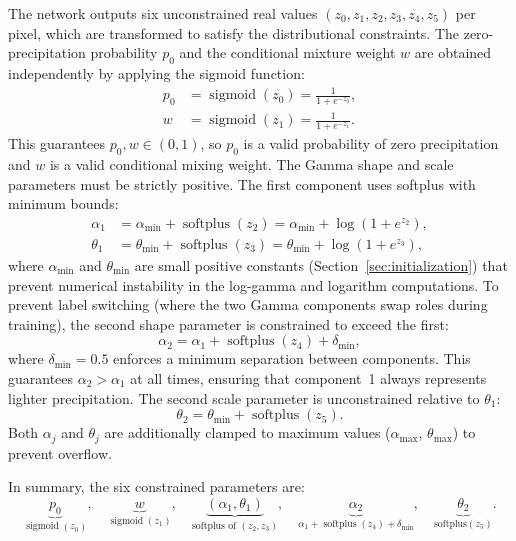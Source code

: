 \documentclass[11pt]{article}
\DeclareMathOperator{\softplus}{softplus}
\DeclareMathOperator{\sigmoid}{sigmoid}
\begin{document}
The network outputs six unconstrained real values
$(z_0, z_1, z_2, z_3, z_4, z_5)$ per pixel, which are
transformed to satisfy the distributional constraints.
The zero-precipitation probability $p_0$ and the conditional
mixture weight $w$ are obtained independently by applying the
sigmoid function:
\begin{align}
  p_0 &= \sigmoid(z_0) = \frac{1}{1 + e^{-z_0}},
    \label{eq:sigmoid_p0} \\
  w   &= \sigmoid(z_1) = \frac{1}{1 + e^{-z_1}}.
    \label{eq:sigmoid_w}
\end{align}
This guarantees $p_0, w \in (0, 1)$, so $p_0$ is a valid
probability of zero precipitation and $w$ is a valid conditional
mixing weight.
The Gamma shape and scale parameters must be strictly positive.
The first component uses softplus with minimum bounds:
\begin{align}
  \alpha_1 &= \alpha_{\min} + \softplus(z_2)
    = \alpha_{\min} + \log(1 + e^{z_2}),
    \label{eq:shape1} \\
  \theta_1 &= \theta_{\min} + \softplus(z_3)
    = \theta_{\min} + \log(1 + e^{z_3}),
    \label{eq:scale1}
\end{align}
where $\alpha_{\min}$ and $\theta_{\min}$ are small positive
constants (Section~\ref{sec:initialization}) that prevent
numerical instability in the log-gamma and logarithm computations.
To prevent label switching (where the two Gamma components swap
roles during training), the second shape parameter is constrained
to exceed the first:
\begin{equation}
  \alpha_2 = \alpha_1 + \softplus(z_4) + \delta_{\min},
  \label{eq:shape2_constraint}
\end{equation}
where $\delta_{\min} = 0.5$ enforces a minimum separation between
components.  This guarantees $\alpha_2 > \alpha_1$ at all times,
ensuring that component~1 always represents lighter precipitation.
The second scale parameter is unconstrained relative to $\theta_1$:
\begin{equation}
  \theta_2 = \theta_{\min} + \softplus(z_5).
  \label{eq:scale2}
\end{equation}
Both $\alpha_j$ and $\theta_j$ are additionally clamped to maximum
values ($\alpha_{\max}$, $\theta_{\max}$) to prevent overflow.

In summary, the six constrained parameters are:
\begin{equation}
  \underbrace{p_0}_{\sigmoid(z_0)},\quad
  \underbrace{w}_{\sigmoid(z_1)},\quad
  \underbrace{(\alpha_1, \theta_1)}_{\text{softplus of } (z_2, z_3)},\quad
  \underbrace{\alpha_2}_{\alpha_1 + \softplus(z_4) + \delta_{\min}},\quad
  \underbrace{\theta_2}_{\text{softplus}(z_5)}.
  \label{eq:all_params}
\end{equation}
\end{document}
